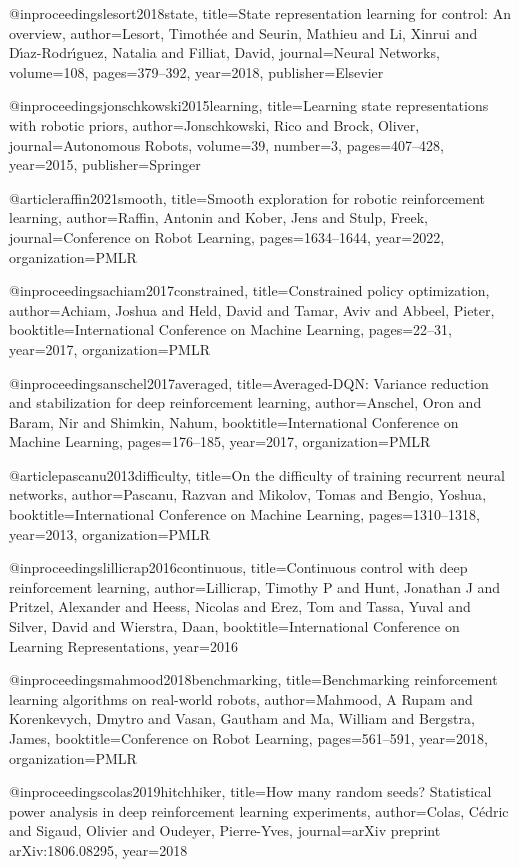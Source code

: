@inproceedings{lesort2018state,
  title={State representation learning for control: An overview},
  author={Lesort, Timoth{\'e}e and Seurin, Mathieu and Li, Xinrui and D{\'\i}az-Rodr{\'\i}guez, Natalia and Filliat, David},
  journal={Neural Networks},
  volume={108},
  pages={379--392},
  year={2018},
  publisher={Elsevier}
}

@inproceedings{jonschkowski2015learning,
  title={Learning state representations with robotic priors},
  author={Jonschkowski, Rico and Brock, Oliver},
  journal={Autonomous Robots},
  volume={39},
  number={3},
  pages={407--428},
  year={2015},
  publisher={Springer}
}

@article{raffin2021smooth,
  title={Smooth exploration for robotic reinforcement learning},
  author={Raffin, Antonin and Kober, Jens and Stulp, Freek},
  journal={Conference on Robot Learning},
  pages={1634--1644},
  year={2022},
  organization={PMLR}
}

@inproceedings{achiam2017constrained,
  title={Constrained policy optimization},
  author={Achiam, Joshua and Held, David and Tamar, Aviv and Abbeel, Pieter},
  booktitle={International Conference on Machine Learning},
  pages={22--31},
  year={2017},
  organization={PMLR}
}

@inproceedings{anschel2017averaged,
  title={Averaged-DQN: Variance reduction and stabilization for deep reinforcement learning},
  author={Anschel, Oron and Baram, Nir and Shimkin, Nahum},
  booktitle={International Conference on Machine Learning},
  pages={176--185},
  year={2017},
  organization={PMLR}
}

@article{pascanu2013difficulty,
  title={On the difficulty of training recurrent neural networks},
  author={Pascanu, Razvan and Mikolov, Tomas and Bengio, Yoshua},
  booktitle={International Conference on Machine Learning},
  pages={1310--1318},
  year={2013},
  organization={PMLR}
}

@inproceedings{lillicrap2016continuous,
  title={Continuous control with deep reinforcement learning},
  author={Lillicrap, Timothy P and Hunt, Jonathan J and Pritzel, Alexander and Heess, Nicolas and Erez, Tom and Tassa, Yuval and Silver, David and Wierstra, Daan},
  booktitle={International Conference on Learning Representations},
  year={2016}
}

@inproceedings{mahmood2018benchmarking,
  title={Benchmarking reinforcement learning algorithms on real-world robots},
  author={Mahmood, A Rupam and Korenkevych, Dmytro and Vasan, Gautham and Ma, William and Bergstra, James},
  booktitle={Conference on Robot Learning},
  pages={561--591},
  year={2018},
  organization={PMLR}
}

@inproceedings{colas2019hitchhiker,
  title={How many random seeds? Statistical power analysis in deep reinforcement learning experiments},
  author={Colas, C{\'e}dric and Sigaud, Olivier and Oudeyer, Pierre-Yves},
  journal={arXiv preprint arXiv:1806.08295},
  year={2018}
}

